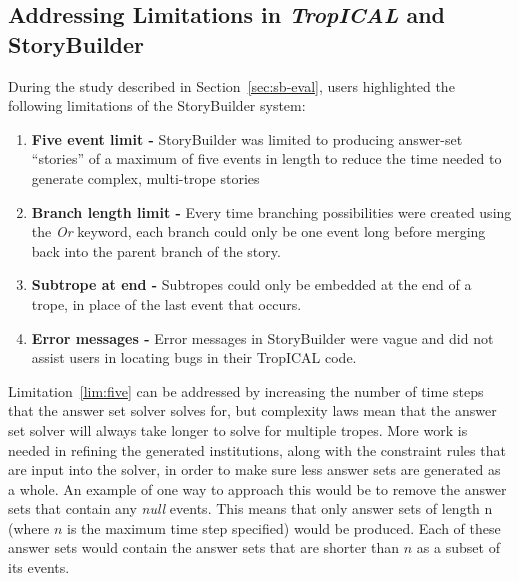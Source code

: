 \documentclass[11pt]{report}
\begin{document}

\subsection{Addressing Limitations in \emph{TropICAL} and StoryBuilder}
\label{sec:future-address}

During the study described in Section~\ref{sec:sb-eval}, users highlighted the
following limitations of the StoryBuilder system:

\begin{enumerate}[{Limitation} 1:]
\item\label{lim:five} \textbf{Five event limit -} StoryBuilder was limited to producing
  answer-set ``stories'' of a maximum of five events in length to reduce the
  time needed to generate complex, multi-trope stories
\item\label{lim:branch} \textbf{Branch length limit -} Every time branching
  possibilities were created using the \emph{Or} keyword, each branch could only
  be one event long before merging back into the parent branch of the story.
\item\label{lim:sub} \textbf{Subtrope at end -} Subtropes could only be embedded
  at the end of a trope, in place of the last event that occurs.
\item\label{lim:error} \textbf{Error messages -} Error messages in StoryBuilder
  were vague and did not assist users in locating bugs in their TropICAL code.
\end{enumerate}

Limitation~\ref{lim:five} can be addressed by increasing the number of time steps
that the answer set solver solves for, but complexity laws mean that the answer
set solver will always take longer to solve for multiple tropes.
More work is needed in refining the generated
institutions, along with the constraint rules that are input into the solver, in
order to make sure less answer sets are generated as a whole. An example of one
way to approach this would be to remove the answer sets that contain any
\emph{null} events. This means that only answer sets of length n (where $n$ is
the maximum time step specified) would be produced. Each of these answer sets
would contain the answer sets that are shorter than $n$ as a subset of its events.
\end{document}
